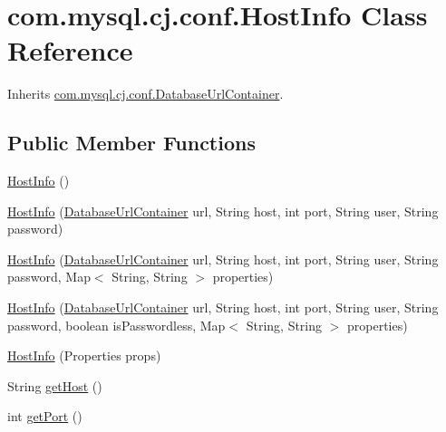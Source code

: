 \hypertarget{classcom_1_1mysql_1_1cj_1_1conf_1_1_host_info}{}\section{com.\+mysql.\+cj.\+conf.\+Host\+Info Class Reference}
\label{classcom_1_1mysql_1_1cj_1_1conf_1_1_host_info}


Inherits \mbox{\hyperlink{interfacecom_1_1mysql_1_1cj_1_1conf_1_1_database_url_container}{com.\+mysql.\+cj.\+conf.\+Database\+Url\+Container}}.

\subsection*{Public Member Functions}
\begin{DoxyCompactItemize}
\item 
\mbox{\hyperlink{classcom_1_1mysql_1_1cj_1_1conf_1_1_host_info_a4560d8ddc8f66b75d4285b0bb1e3a2c0}{Host\+Info}} ()
\item 
\mbox{\hyperlink{classcom_1_1mysql_1_1cj_1_1conf_1_1_host_info_abf279f3212ad1fe272189757ef090d90}{Host\+Info}} (\mbox{\hyperlink{interfacecom_1_1mysql_1_1cj_1_1conf_1_1_database_url_container}{Database\+Url\+Container}} url, String host, int port, String user, String password)
\item 
\mbox{\hyperlink{classcom_1_1mysql_1_1cj_1_1conf_1_1_host_info_a8a1fe5f76612d02152c4c8256adf5a01}{Host\+Info}} (\mbox{\hyperlink{interfacecom_1_1mysql_1_1cj_1_1conf_1_1_database_url_container}{Database\+Url\+Container}} url, String host, int port, String user, String password, Map$<$ String, String $>$ properties)
\item 
\mbox{\hyperlink{classcom_1_1mysql_1_1cj_1_1conf_1_1_host_info_a0fcc1bf37adac929b5b66642f535beff}{Host\+Info}} (\mbox{\hyperlink{interfacecom_1_1mysql_1_1cj_1_1conf_1_1_database_url_container}{Database\+Url\+Container}} url, String host, int port, String user, String password, boolean is\+Passwordless, Map$<$ String, String $>$ properties)
\item 
\mbox{\hyperlink{classcom_1_1mysql_1_1cj_1_1conf_1_1_host_info_a9fe0d4cd94cfc72b8fdb56ac6f72a810}{Host\+Info}} (Properties props)
\item 
String \mbox{\hyperlink{classcom_1_1mysql_1_1cj_1_1conf_1_1_host_info_acae50ff394b02e8a7c6874b8d00d48f5}{get\+Host}} ()
\item 
int \mbox{\hyperlink{classcom_1_1mysql_1_1cj_1_1conf_1_1_host_info_af0c2b397e445567f8217eb989a9f4fbf}{get\+Port}} ()

\end{DoxyCompactItemize}
